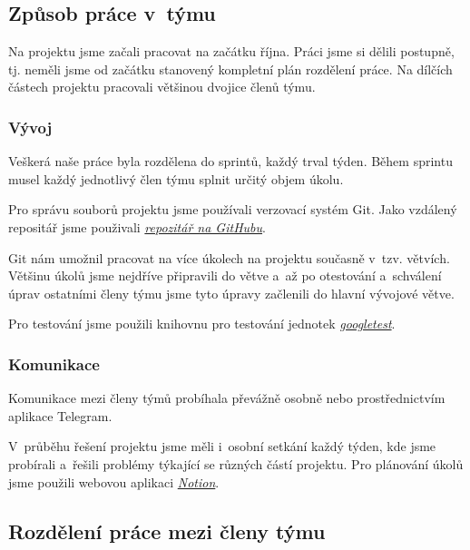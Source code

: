 \documentclass[a4paper, 11pt]{article}
\begin{document}
	\subsection{Způsob práce v~týmu}

	Na projektu jsme začali pracovat na začátku října. Práci jsme si dělili postupně, tj. neměli jsme od začátku
	stanovený kompletní plán rozdělení práce. Na dílčích částech projektu pracovali většinou
	dvojice členů týmu.

	\subsubsection{Vývoj}

	Veškerá naše práce byla rozdělena do sprintů, každý trval týden. Během sprintu musel každý jednotlivý člen týmu
	splnit určitý objem úkolu.

	Pro správu souborů projektu jsme používali verzovací systém Git. Jako vzdálený repositář jsme použivali
	\href{https://github.com/NickSettler/ifj_proj_2022}{\textit{repozitář na GitHubu}}.

	Git nám umožnil pracovat na více úkolech na projektu současně v~tzv. větvích. Většinu úkolů jsme nejdříve
	připravili do větve a~až po otestování a~schválení úprav ostatními členy týmu jsme tyto úpravy začlenili do
	hlavní vývojové větve.

	Pro testování jsme použili knihovnu pro testování jednotek \href{https://github.com/google/googletest}{\textit{googletest}}.

	\subsubsection{Komunikace}

	Komunikace mezi členy týmů probíhala převážně osobně nebo prostřednictvím aplikace Telegram.

	V~průběhu řešení projektu jsme měli i~osobní setkání každý týden, kde jsme probírali a~řešili problémy
	týkající se různých částí projektu. Pro plánování úkolů jsme použili webovou aplikaci \href{https://www.notion.so/378b8a4e4c564637be15b61858153ba3?v=438ac593c40b4649974738e0dc0ae2a3}{\textit{Notion}}.

	\subsection{Rozdělení práce mezi členy týmu}
\end{document}
